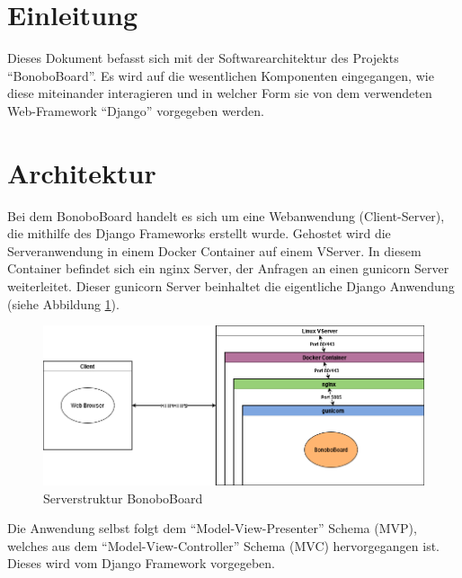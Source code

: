 \documentclass[a4paper,11pt]{scrartcl}
\begin{document}



\section{Einleitung}
Dieses Dokument befasst sich mit der Softwarearchitektur des Projekts "`BonoboBoard"'. Es wird auf die wesentlichen Komponenten eingegangen, wie diese miteinander interagieren und in welcher Form sie von dem verwendeten Web-Framework "`Django"' vorgegeben werden.

\section{Architektur}

Bei dem BonoboBoard handelt es sich um eine Webanwendung (Client-Server), die mithilfe des Django Frameworks erstellt wurde. Gehostet wird die Serveranwendung in einem Docker Container auf einem  VServer. In diesem Container befindet sich ein nginx Server, der Anfragen an einen gunicorn Server weiterleitet. Dieser gunicorn Server beinhaltet die eigentliche Django Anwendung (siehe Abbildung \ref{img:Serverstruktur}).

\begin{figure}[H]
	\includegraphics[width=\textwidth]{Serverstruktur}
	\caption{Serverstruktur BonoboBoard}
	\label{img:Serverstruktur}
\end{figure}

Die Anwendung selbst folgt dem "`Model-View-Presenter"' Schema (MVP), welches aus dem "`Model-View-Controller"' Schema (MVC) hervorgegangen ist. %
Dieses wird vom Django Framework vorgegeben. 
\end{document}
